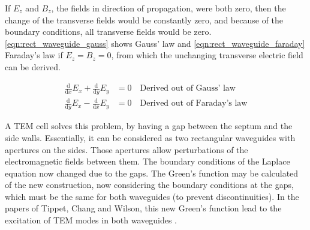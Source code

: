 If $E_z$ and $B_z$, the fields in direction of propagation, were both zero, then the change of the transverse fields would be constantly zero, and because of the boundary conditions, all transverse fields would be zero. \autoref{eqn:rect_waveguide_gauss} shows Gauss' law and \autoref{eqn:rect_waveguide_faraday} Faraday's law if $E_z=B_z=0$, from which the unchanging transverse electric field can be derived. 

\begin{align}
    \frac{\mathrm{d}}{\mathrm{d}x}E_x+\frac{\mathrm{d}}{\mathrm{d}y}E_y&=0\quad\text{Derived out of Gauss' law}\label{eqn:rect_waveguide_gauss}\\
    \frac{\mathrm{d}}{\mathrm{d}y}E_x-\frac{\mathrm{d}}{\mathrm{d}x}E_y&=0\quad\text{Derived out of Faraday's law}\label{eqn:rect_waveguide_faraday}
\end{align}

A TEM cell solves this problem, by having a gap between the septum and the side walls. Essentially, it can be considered as two rectangular waveguides with apertures on the sides. Those apertures allow perturbations of the electromagnetic fields between them. The boundary conditions of the Laplace equation now changed due to the gaps. The Green's function may be calculated of the new construction, now considering the boundary conditions at the gaps, which must be the same for both waveguides (to prevent discontinuities). In the papers of Tippet, Chang and Wilson, this new Green's function lead to the excitation of TEM modes in both waveguides \cite{Tippet_Chang_Crawford_1976,Wilson_1981}. 



